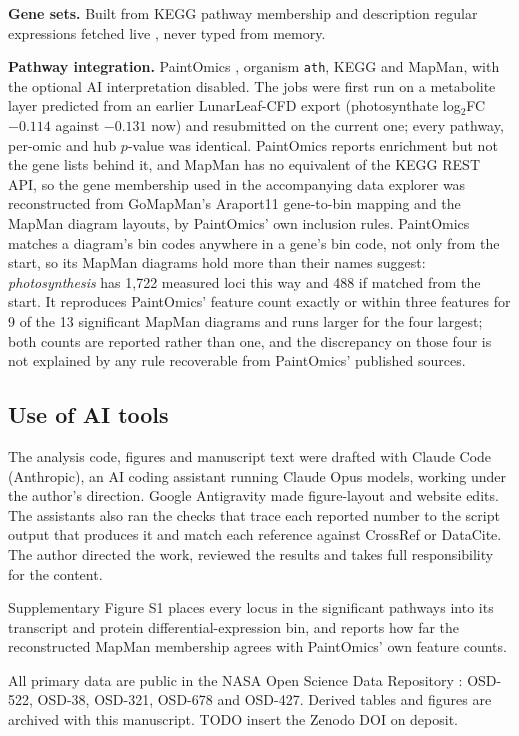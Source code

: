 \documentclass[pdflatex,sn-nature]{sn-jnl}
\begin{document}
\textbf{Gene sets.} Built from KEGG pathway membership and description regular expressions
fetched live \citep{kanehisa2000,kegg}, never typed from memory.

\textbf{Pathway integration.} PaintOmics \citep{paintomics4}, organism \texttt{ath}, KEGG and
MapMan, with the optional AI interpretation disabled. The jobs were first run on a metabolite
layer predicted from an earlier LunarLeaf-CFD export (photosynthate log$_2$FC $-0.114$ against
$-0.131$ now) and resubmitted on the current one; every pathway, per-omic and hub $p$-value was
identical. PaintOmics reports enrichment but not
the gene lists behind it, and MapMan has no equivalent of the KEGG REST API, so the gene
membership used in the accompanying data explorer was reconstructed from GoMapMan's
Araport11 gene-to-bin mapping and the MapMan diagram layouts, by PaintOmics' own inclusion
rules. PaintOmics matches a diagram's bin codes anywhere in a gene's bin code, not only from
the start, so its MapMan diagrams hold more than their names suggest: \textit{photosynthesis}
has 1{,}722 measured loci this way and 488 if matched from the start. It reproduces PaintOmics'
feature count exactly or within three features for 9 of the 13 significant MapMan diagrams
and runs larger for the four largest;
both counts are reported rather than one, and the discrepancy on those four is not
explained by any rule recoverable from PaintOmics' published sources.

\subsection{Use of AI tools}
The analysis code, figures and manuscript text were drafted with Claude Code (Anthropic), an AI
coding assistant running Claude Opus models, working under the author's direction. Google
Antigravity made figure-layout and website edits. The assistants also ran the checks that trace
each reported number to the script output that produces it and match each reference against
CrossRef or DataCite. The author directed the work, reviewed the results and takes full
responsibility for the content.

\backmatter

Supplementary Figure S1 places every locus in the significant pathways into its transcript
and protein differential-expression bin, and reports how far the reconstructed MapMan
membership agrees with PaintOmics' own feature counts.

All primary data are public in the NASA Open Science Data Repository \citep{osdr2025}:
OSD-522, OSD-38, OSD-321, OSD-678 and OSD-427. Derived tables and figures are archived with
this manuscript. TODO insert the Zenodo DOI on deposit.
\end{document}
